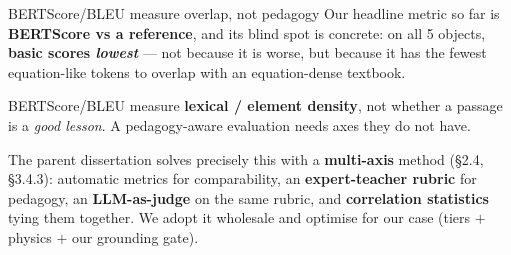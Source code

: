 \documentclass[aspectratio=169,10pt]{beamer}
\newcommand{\hl}[1]{{\bfseries\color{cAccent}#1}}
\begin{document}
\begin{frame}{BERTScore/BLEU measure overlap, not pedagogy}
\small
Our headline metric so far is \textbf{BERTScore vs a reference}, and its blind spot is
concrete: on all 5 objects, \hl{basic scores \emph{lowest}} --- not because it is worse, but
because it has the fewest equation-like tokens to overlap with an equation-dense textbook.
\vspace{0.4em}
\begin{tcolorbox}[colback=cAccent!6,colframe=cAccent,boxsep=2pt,left=5pt,right=5pt]
\small BERTScore/BLEU measure \textbf{lexical / element density}, not whether a passage is a
\emph{good lesson}. A pedagogy-aware evaluation needs axes they do not have.
\end{tcolorbox}
\vspace{0.5em}
The parent dissertation solves precisely this with a \textbf{multi-axis} method (§2.4, §3.4.3):
automatic metrics for comparability, an \textbf{expert-teacher rubric} for pedagogy, an
\textbf{LLM-as-judge} on the same rubric, and \textbf{correlation statistics} tying them together.
We adopt it wholesale and optimise for our case (tiers $+$ physics $+$ our grounding gate).
\end{frame}
\end{document}
